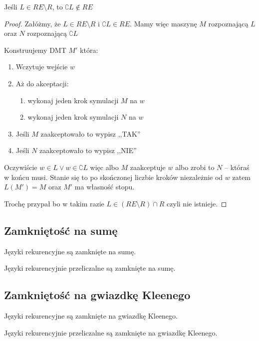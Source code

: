 \begin{theorem}
    Jeśli \( L \in RE \setminus R \), to \( \complement{L} \not \in RE\) 
\end{theorem}
\begin{proof}
    Załóżmy, że \( L \in RE \setminus R \) i \( \complement{L} \in RE\). 
    Mamy więc maszynę \( M \) rozpoznającą \( L \) oraz \( N \) rozpoznającą \( \complement{L} \)
    
    Konstruujemy DMT \( M' \) która:
    \begin{enumerate}
        \item Wczytuje wejście \( w \)
        \item Aż do akceptacji:
        \begin{enumerate}
            \item wykonaj jeden krok symulacji \( M \) na \( w \)
            \item wykonaj jeden krok symulacji \( N \) na \( w \)
        \end{enumerate}
        \item Jeśli \( M \) zaakceptowało to wypisz ,,TAK''
        \item Jeśli \( N \) zaakceptowało to wypisz ,,NIE''
    \end{enumerate}
    
    Oczywiście \( w \in L \lor w \in \complement{L} \) więc albo \( M \) zaakceptuje \( w \) albo zrobi to \( N \) -- któraś w końcu musi.
    Stanie się to po skończonej liczbie kroków niezależnie od \( w \) zatem \( L(M') = M \) oraz \( M' \) ma własność stopu.
    
    Trochę przypał bo w takim razie \( L \in (RE \setminus R) \cap R \) czyli nie istnieje.
    
\end{proof}

\subsection{Zamkniętość na sumę}

\begin{theorem}
    Języki rekurencyjne są zamknięte na sumę.
\end{theorem}

\begin{theorem}
    Języki rekurencyjnie przeliczalne są zamknięte na sumę.
\end{theorem}

\subsection{Zamkniętość na gwiazdkę Kleenego}

\begin{theorem}
    Języki rekurencyjne są zamknięte na gwiazdkę Kleenego.
\end{theorem}

\begin{theorem}
    Języki rekurencyjnie przeliczalne są zamknięte na gwiazdkę Kleenego.
\end{theorem}